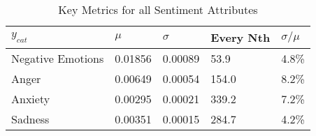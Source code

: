 \begin{table}[h]\centering
\begin{adjustbox}{width=\linewidth, center}
	\begin{tabular}{lllll}
	\toprule
	$y_{cat}$ &    $\mu$ & $\sigma$ & Every Nth & $\sigma / \mu$ \\
	\midrule
	Negative Emotions &  0.01856 &  0.00089 &      53.9 &          4.8\% \\
	Anger             &  0.00649 &  0.00054 &     154.0 &          8.2\% \\
	Anxiety           &  0.00295 &  0.00021 &     339.2 &          7.2\% \\
	Sadness           &  0.00351 &  0.00015 &     284.7 &          4.2\% \\
	\bottomrule
	\end{tabular}
	
\end{adjustbox}
	\caption{Key Metrics for all Sentiment Attributes}
	\label{fig: mean_std}
\end{table}

